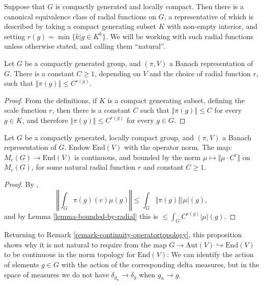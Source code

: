 Suppose that $G$ is compactly generated and locally compact. Then there is a canonical equivalence class of radial functions on $G$, a representative of which is described by taking a compact generating subset $K$ with non-empty interior, and setting $r(g) = \min\{k| g\in K^k\}$. We will be working with such radial functions unless otherwise stated, and calling them ``natural''. 


\begin{lemma}
\label{lemma-bounded-by-radial}
Let $G$ be a compactly generated group, and $(\pi,V)$ a Banach representation of $G$.
There is a constant $C\ge 1$, depending on $V$ and the choice of radial function $r$, such that $\Vert \pi(g)\Vert \le C^{r(g)}$.
\end{lemma}

\begin{proof}
 From the definitions, if $K$ is a compact generating subset, defining the scale function $r$, then there is a constant $C$ such that $\Vert\pi(g)\Vert \le C$ for every $g\in K$, and therefore $\Vert\pi(g)\Vert \le C^{r(g)}$ for every $g\in G$.
\end{proof}

\begin{proposition}
\label{proposition-integral-Banach}
Let $G$ be a compactly generated, locally compact group, and $(\pi, V)$ a Banach representation of $G$. Endow $\text{End}(V)$ with the operator norm. The map: $M_c(G)\to \text{End}(V)$ is continuous, and bounded by the norm $\mu\mapsto \Vert \mu \cdot C^r\Vert$ on $M_c(G)$, for some natural radial function $r$ and constant $C \ge 1$.
\end{proposition}

\begin{proof}
 By \cite[Theorem 3.29]{Rudin}, 
 $$
 \left\Vert \int_G \pi(g)(v) \mu(g)\right\Vert \le \int_G \Vert \pi(g)\Vert |\mu|(g),
 $$
 and by Lemma \ref{lemma-bounded-by-radial} this is $\le \int_G C^{r(g)} |\mu|(g)$. 
\end{proof}


\begin{remark}
\label{remark-continuity-algebras}
Returning to Remark \ref{remark-continuity-operatortopology},  this proposition shows why it is not natural to require from the map $G\to \text{Aut}(V)\hookrightarrow \text{End}(V)$ to be continuous in the norm topology for $\text{End}(V)$: We can identify the action of elements $g\in G$ with the action of the corresponding delta measures, but in the space of measures we do not have $\delta_{g_n}\to \delta_g$ when $g_n\to g$.
\end{remark}


